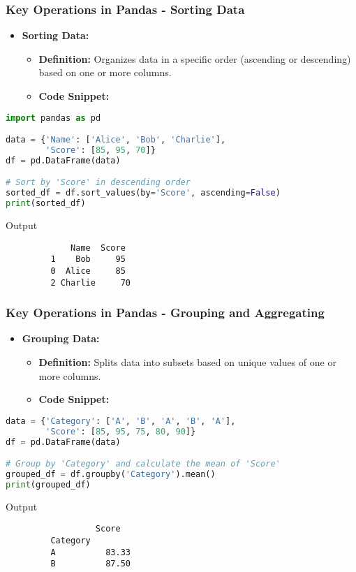 \documentclass[aspectratio=169]{beamer}
\begin{document}
\begin{frame}[fragile]
    \frametitle{Key Operations in Pandas - Sorting Data}
    \begin{itemize}
        \item \textbf{Sorting Data:}
        \begin{itemize}
            \item \textbf{Definition:} Organizes data in a specific order (ascending or descending) based on one or more columns.
            \item \textbf{Code Snippet:}
        \end{itemize}
    \end{itemize}
    \begin{lstlisting}[language=Python]
import pandas as pd

data = {'Name': ['Alice', 'Bob', 'Charlie'],
        'Score': [85, 95, 70]}
df = pd.DataFrame(data)

# Sort by 'Score' in descending order
sorted_df = df.sort_values(by='Score', ascending=False)
print(sorted_df)
    \end{lstlisting}
    \begin{block}{Output}
         \begin{verbatim}
             Name  Score
         1    Bob     95
         0  Alice     85
         2 Charlie     70
         \end{verbatim}
    \end{block}
\end{frame}

\begin{frame}[fragile]
    \frametitle{Key Operations in Pandas - Grouping and Aggregating}
    \begin{itemize}
        \item \textbf{Grouping Data:}
        \begin{itemize}
            \item \textbf{Definition:} Splits data into subsets based on unique values of one or more columns.
            \item \textbf{Code Snippet:}
        \end{itemize}
    \end{itemize}
    \begin{lstlisting}[language=Python]
data = {'Category': ['A', 'B', 'A', 'B', 'A'],
        'Score': [85, 95, 75, 80, 90]}
df = pd.DataFrame(data)

# Group by 'Category' and calculate the mean of 'Score'
grouped_df = df.groupby('Category').mean()
print(grouped_df)
    \end{lstlisting}
    \begin{block}{Output}
         \begin{verbatim}
                  Score
         Category       
         A          83.33
         B          87.50
         \end{verbatim}
    \end{block}
\end{frame}
\end{document}
